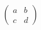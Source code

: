 \documentclass{article}
\begin{document}
\begin{equation}
\begin{pmatrix} a & b \\ c & d \end{pmatrix}
\end{equation}
\end{document}
